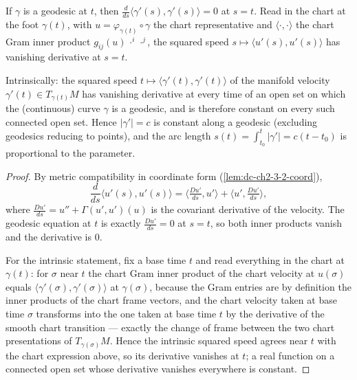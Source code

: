 \begin{lemma}
  \label{lem:dc-ch3-2-1-constspeed}
  \leanok
  If $\gamma$ is a geodesic at $t$, then
  $\frac{d}{ds}\big\langle\gamma'(s),\gamma'(s)\big\rangle=0$ at $s=t$. Read in
  the chart at the foot $\gamma(t)$, with $u=\varphi_{\gamma(t)}\circ\gamma$ the
  chart representative and $\langle\cdot,\cdot\rangle$ the chart Gram inner
  product $g_{ij}(u)\,\cdot^i\,\cdot^j$, the squared speed
  $s\mapsto\langle u'(s),u'(s)\rangle$ has vanishing derivative at $s=t$.

  Intrinsically: the squared speed
  $t\mapsto\langle\gamma'(t),\gamma'(t)\rangle$ of the manifold velocity
  $\gamma'(t)\in T_{\gamma(t)}M$ has vanishing derivative at every time of an
  open set on which the (continuous) curve $\gamma$ is a geodesic, and is
  therefore constant on every such connected open set. Hence $|\gamma'|=c$ is
  constant along a geodesic (excluding geodesics reducing to points), and the
  arc length $s(t)=\int_{t_0}^t|\gamma'|=c(t-t_0)$ is proportional to the
  parameter.
\end{lemma}
\begin{proof}
  \sketch
  \leanok
  By metric compatibility in coordinate form
  (\cref{lem:dc-ch2-3-2-coord}),
  $$
  \frac{d}{ds}\big\langle u'(s),u'(s)\big\rangle
    =\Big\langle\tfrac{Du'}{ds},u'\Big\rangle+\Big\langle u',\tfrac{Du'}{ds}\Big\rangle,
  $$
  where $\frac{Du'}{ds}=u''+\Gamma(u',u')(u)$ is the covariant derivative of the
  velocity. The geodesic equation at $t$ is exactly $\frac{Du'}{ds}=0$ at $s=t$,
  so both inner products vanish and the derivative is $0$.

  For the intrinsic statement, fix a base time $t$ and read everything in the
  chart at $\gamma(t)$: for $\sigma$ near $t$ the chart Gram inner product of
  the chart velocity at $u(\sigma)$ equals
  $\langle\gamma'(\sigma),\gamma'(\sigma)\rangle$ at $\gamma(\sigma)$, because
  the Gram entries are by definition the inner products of the chart frame
  vectors, and the chart velocity taken at base time $\sigma$ transforms into
  the one taken at base time $t$ by the derivative of the smooth chart
  transition — exactly the change of frame between the two chart
  presentations of $T_{\gamma(\sigma)}M$. Hence the intrinsic squared speed
  agrees near $t$ with the chart expression above, so its derivative vanishes
  at $t$; a real function on a connected open set whose derivative vanishes
  everywhere is constant.
\end{proof}

